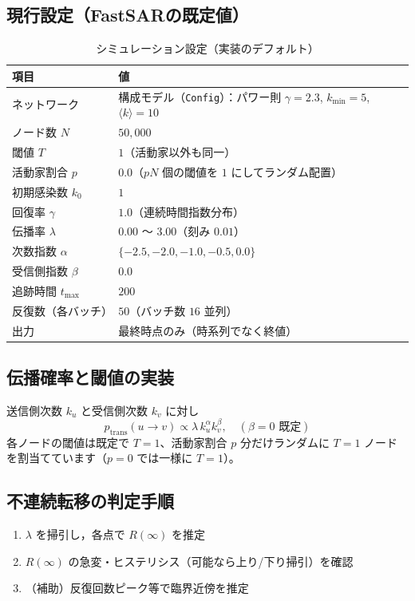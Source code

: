 \documentclass[uplatex,dvipdfmx,11pt]{bxjsarticle}
\begin{document}
\subsection{現行設定（FastSARの既定値）}
\begin{table}[htbp]
  \centering
  \caption{シミュレーション設定（実装のデフォルト）}
  \label{tab:params}
  \begin{tabular}{@{}ll@{}}
    \toprule
    項目 & 値 \\ \midrule
    ネットワーク & 構成モデル（\texttt{Config}）：パワー則 $\gamma=2.3$, $k_{\min}=5$, $\langle k\rangle=10$ \\
    ノード数 $N$ & $50{,}000$ \\
    閾値 $T$ & $1$（活動家以外も同一） \\
    活動家割合 $p$ & $0.0$（$pN$ 個の閾値を $1$ にしてランダム配置） \\
    初期感染数 $k_0$ & $1$ \\
    回復率 $\gamma$ & $1.0$（連続時間指数分布） \\
    伝播率 $\lambda$ & $0.00$ 〜 $3.00$（刻み $0.01$） \\
    次数指数 $\alpha$ & $\{-2.5,-2.0,-1.0,-0.5,0.0\}$ \\
    受信側指数 $\beta$ & $0.0$ \\
    追跡時間 $t_{\max}$ & $200$ \\
    反復数（各バッチ） & $50$（バッチ数 $16$ 並列） \\
    出力 & 最終時点のみ（時系列でなく終値） \\
    \bottomrule
  \end{tabular}
\end{table}

\subsection{伝播確率と閾値の実装}
送信側次数 $k_u$ と受信側次数 $k_v$ に対し
\begin{equation}
p_{\text{trans}}(u\to v) \propto \lambda\, k_u^{\alpha} k_v^{\beta}, \quad (\beta=0\text{ 既定})
\end{equation}
各ノードの閾値は既定で $T{=}1$、活動家割合 $p$ 分だけランダムに $T{=}1$ ノードを割当てています（$p{=}0$ では一様に $T{=}1$）。

\subsection{不連続転移の判定手順}
\begin{enumerate}[leftmargin=2em]
  \item $\lambda$ を掃引し，各点で $R(\infty)$ を推定
  \item $R(\infty)$ の急変・ヒステリシス（可能なら上り/下り掃引）を確認
  \item （補助）反復回数ピーク等で臨界近傍を推定
\end{enumerate}
\end{document}
